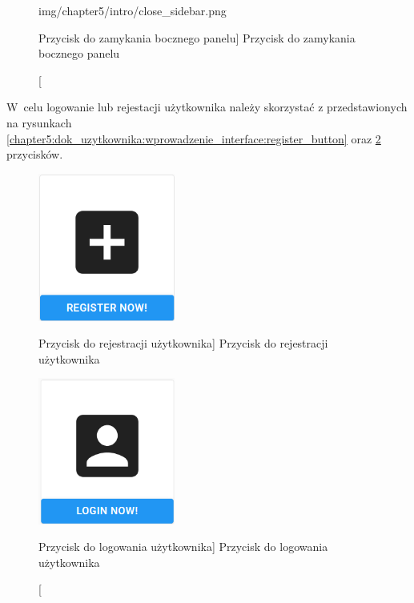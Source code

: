 \documentclass[../Kamil_Kowalewski_Main.tex]{subfiles}
\begin{document}
{{\begin{figure}[H]
\begin{minipage}[b]{0.4\textwidth}
                {img/chapter5/intro/close_sidebar.png}
                \caption
                [Przycisk do zamykania bocznego panelu]
                {Przycisk do zamykania bocznego panelu}
                \label{chapter5:dok_uzytkownika:wprowadzenie_interface:sidebar_close_button}
            \end{minipage}
        \end{figure}

        W~celu logowanie lub rejestacji użytkownika należy skorzystać z przedstawionych
        na rysunkach
        \ref{chapter5:dok_uzytkownika:wprowadzenie_interface:register_button} oraz
        \ref{chapter5:dok_uzytkownika:wprowadzenie_interface:login_button}
        przycisków.
        \begin{figure}[H]
            \centering
            \begin{minipage}[b]{0.4\textwidth}
                \centering
                \includegraphics[width=0.4\textwidth, keepaspectratio]
                {img/chapter5/intro/register_button.png}
                \caption
                [Przycisk do rejestracji użytkownika]
                {Przycisk do rejestracji użytkownika}
                \label{chapter5:dok_uzytkownika:wprowadzenie_interface:register_button}
            \end{minipage}
            \hfill
            \begin{minipage}[b]{0.4\textwidth}
                \centering
                \includegraphics[width=0.4\textwidth, keepaspectratio]
                {img/chapter5/intro/login_button.png}
                \caption
                [Przycisk do logowania użytkownika]
                {Przycisk do logowania użytkownika}
                \label{chapter5:dok_uzytkownika:wprowadzenie_interface:login_button}
            \end{minipage}
        \end{figure}

}}
\end{document}
